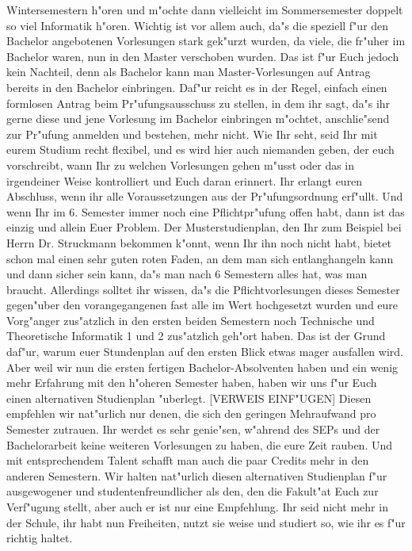 Wintersemestern h"oren und m"ochte dann vielleicht im Sommersemester doppelt so viel Informatik
h"oren.
Wichtig ist vor allem auch, da"s die speziell f"ur den Bachelor angebotenen Vorlesungen stark
gek"urzt wurden, da viele, die fr"uher im Bachelor waren, nun in den Master verschoben wurden. Das
ist f"ur Euch jedoch kein Nachteil, denn als Bachelor kann man Master-Vorlesungen auf Antrag
bereits in den Bachelor einbringen. Daf"ur reicht es in der Regel, einfach einen formlosen Antrag
beim Pr"ufungsausschuss zu stellen, in dem ihr sagt, da"s ihr gerne diese und jene Vorlesung im
Bachelor einbringen m"ochtet, anschlie"send zur Pr"ufung anmelden und bestehen, mehr nicht.
Wie Ihr seht, seid Ihr mit eurem Studium recht flexibel, und es wird hier auch niemanden geben, der
euch vorschreibt, wann Ihr zu welchen Vorlesungen gehen m"usst oder das in irgendeiner Weise
kontrolliert und Euch daran erinnert. Ihr erlangt euren Abschluss, wenn ihr alle Voraussetzungen aus
der Pr"ufungsordnung erf"ullt. Und wenn Ihr im 6. Semester immer noch eine Pflichtpr"ufung offen
habt, dann ist das einzig und allein Euer Problem.
Der Musterstudienplan, den Ihr zum Beispiel bei Herrn Dr. Struckmann bekommen k"onnt, wenn Ihr
ihn noch nicht habt, bietet schon mal einen sehr guten roten Faden, an dem man sich entlanghangeln
kann und dann sicher sein kann, da"s man nach 6 Semestern alles hat, was man braucht. Allerdings
solltet ihr wissen, da"s die Pflichtvorlesungen dieses Semester gegen"uber den vorangegangenen fast
alle im Wert hochgesetzt wurden und eure Vorg"anger zus"atzlich in den ersten beiden Semestern
noch Technische und Theoretische Informatik 1 und 2 zus"atzlich geh"ort haben. Das ist der Grund
daf"ur, warum euer Stundenplan auf den ersten Blick etwas mager ausfallen wird. Aber weil wir nun
die ersten fertigen Bachelor-Absolventen haben und ein wenig mehr Erfahrung mit den h"oheren
Semester haben, haben wir uns f"ur Euch einen alternativen Studienplan "uberlegt. [VERWEIS EINF"UGEN] Diesen empfehlen
wir nat"urlich nur denen, die sich den geringen Mehraufwand pro Semester zutrauen. Ihr werdet es
sehr genie"sen, w"ahrend des SEPs und der Bachelorarbeit keine weiteren Vorlesungen zu haben, die
eure Zeit rauben. Und mit entsprechendem Talent schafft man auch die paar Credits mehr in den
anderen Semestern. Wir halten nat"urlich diesen alternativen Studienplan f"ur ausgewogener und
studentenfreundlicher als den, den die Fakult"at Euch zur Verf"ugung stellt, aber auch er ist nur eine
Empfehlung. Ihr seid nicht mehr in der Schule, ihr habt nun Freiheiten, nutzt sie weise und studiert
so, wie ihr es f"ur richtig haltet.
